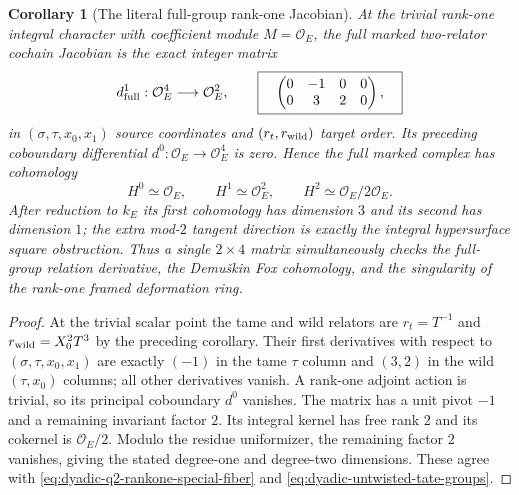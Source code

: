 \documentclass[11pt]{article}
\newtheorem{corollary}[theorem]{Corollary}
\theoremstyle{definition}
\begin{document}
\begin{corollary}[The literal full-group rank-one Jacobian]
\label{cor:dyadic-full-rankone-literal-jacobian}
At the trivial rank-one integral character
with coefficient module $M=\mathcal O_E$,
the full marked two-relator cochain
Jacobian is the exact integer matrix
\begin{equation}\label{eq:dyadic-full-rankone-jacobian-matrix}
d^1_{\rm full}:
\mathcal O_E^4\longrightarrow\mathcal O_E^2,
\qquad
\boxed{\quad
\begin{pmatrix}
0&-1&0&0\\
0&3&2&0
\end{pmatrix},
\quad}
\end{equation}
in $(\sigma,\tau,x_0,x_1)$
source coordinates and
$(r_t,r_{\rm wild})$ target order.
Its preceding coboundary differential
$d^0:\mathcal O_E\to\mathcal O_E^4$
is zero.  Hence the full marked complex
has cohomology
\begin{equation}\label{eq:dyadic-full-rankone-jacobian-cohomology}
H^0\simeq\mathcal O_E,\qquad
H^1\simeq\mathcal O_E^2,\qquad
H^2\simeq\mathcal O_E/2\mathcal O_E.
\end{equation}
After reduction to $k_E$ its first
cohomology has dimension $3$ and
its second has dimension $1$;
the extra mod-$2$ tangent direction
is exactly the integral hypersurface
square obstruction.
Thus a single $2\times4$ matrix
simultaneously checks the full-group
relation derivative, the
Demu\v{s}kin Fox cohomology, and the
singularity of the rank-one
framed deformation ring.
\end{corollary}

\begin{proof}
At the trivial scalar point the
tame and wild relators are
$r_t=T^{-1}$ and $r_{\rm wild}=X_0^2T^3$
by the preceding corollary.
Their first derivatives with
respect to $(\sigma,\tau,x_0,x_1)$
are exactly $(-1)$ in the tame
$\tau$ column and $(3,2)$ in the
wild $(\tau,x_0)$ columns;
all other derivatives vanish.
A rank-one adjoint action is trivial,
so its principal coboundary $d^0$
vanishes.
The matrix has a unit pivot $-1$
and a remaining invariant factor $2$.
Its integral kernel has free rank $2$
and its cokernel is $\mathcal O_E/2$.
Modulo the residue uniformizer,
the remaining factor $2$ vanishes,
giving the stated degree-one and
degree-two dimensions.  These agree
with \eqref{eq:dyadic-q2-rankone-special-fiber}
and \eqref{eq:dyadic-untwisted-tate-groups}.
\end{proof}
\end{document}
